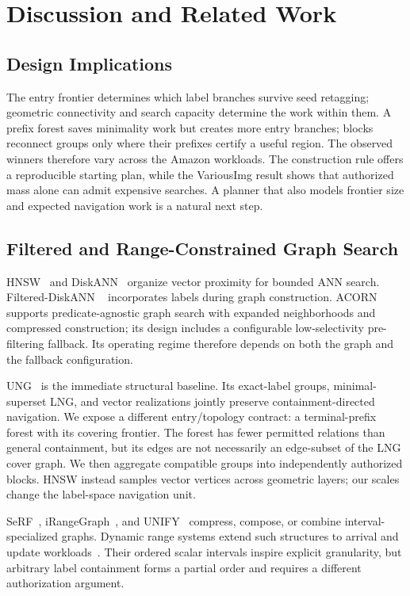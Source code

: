 \section{Discussion and Related Work}
\subsection{Design Implications}
The entry frontier determines which label branches survive seed retagging;
geometric connectivity and search capacity determine the work within them.
A prefix forest saves minimality work but creates more entry branches;
blocks reconnect groups only where their prefixes certify a useful region.
The observed winners therefore vary across the Amazon workloads. The
construction rule offers a reproducible starting plan, while the VariousImg
result shows that authorized mass alone can admit expensive searches.
A planner that also models frontier size and expected navigation work is
a natural next step.

\subsection{Filtered and Range-Constrained Graph Search}
HNSW~\cite{malkov2020hnsw} and DiskANN~\cite{subramanya2019diskann} organize
vector proximity for bounded ANN search. Filtered-DiskANN
~\cite{gollapudi2023filtereddiskann} incorporates labels during graph
construction. ACORN~\cite{patel2024acorn} supports predicate-agnostic graph
search with expanded neighborhoods and compressed construction; its design
includes a configurable low-selectivity pre-filtering fallback. Its operating regime therefore depends on both the graph and the fallback
configuration.

UNG~\cite{cai2024ung} is the immediate structural baseline. Its exact-label
groups, minimal-superset LNG, and vector realizations jointly preserve
containment-directed navigation. We expose a different entry/topology contract:
a terminal-prefix forest with its covering frontier. The forest has fewer
permitted relations than general containment, but its edges are not necessarily
an edge-subset of the LNG cover graph. We then aggregate compatible groups
into independently authorized blocks. HNSW instead samples vector vertices
across geometric layers; our scales change the label-space navigation unit.

SeRF~\cite{zuo2024serf}, iRangeGraph~\cite{xu2024irangegraph}, and
UNIFY~\cite{liang2024unify} compress, compose, or combine interval-specialized
graphs. Dynamic range systems extend such structures to arrival and update
workloads~\cite{peng2025dynamic,zhang2025rangepq}. Their ordered scalar
intervals inspire explicit granularity, but arbitrary label containment forms
a partial order and requires a different authorization argument.

